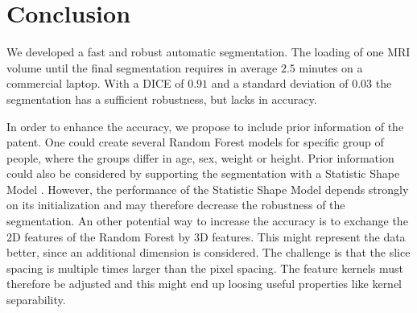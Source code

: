 \section{Conclusion}
We developed a fast and robust automatic segmentation. The loading of one MRI volume until the final segmentation requires in average $2.5$ minutes on a commercial laptop. With a DICE of $0.91$ and a standard deviation of $0.03$ the segmentation has a sufficient robustness, but lacks in accuracy.

In order to enhance the accuracy, we propose to include prior information of the patent. One could create several Random Forest models for specific group of people, where the groups differ in age, sex, weight or height. Prior information could also be considered by supporting the segmentation with a Statistic Shape Model \cite{heimann2009statistical}. However, the performance of the Statistic Shape Model depends strongly on its initialization and may therefore decrease the robustness of the segmentation.
An other potential way to increase the accuracy is to exchange the 2D features of the Random Forest by 3D features. This might represent the data better, since an additional dimension is considered. The challenge is that the slice spacing is multiple times larger than the pixel spacing. The feature kernels must therefore be adjusted and this might end up loosing useful properties like kernel separability.
